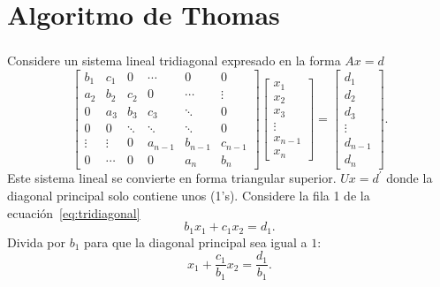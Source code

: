 \section{Algoritmo de Thomas}

\begin{frame}
	\frametitle{\insertsection}

	Considere un sistema lineal tridiagonal expresado en la forma $Ax=d$
	\begin{equation}\label{eq:tridiagonal}
		\begin{bmatrix}
			b_{1}  & c_{1}  & 0      & \cdots  & 0       & 0       \\
			a_{2}  & b_{2}  & c_{2}  & 0       & \cdots  & \vdots  \\
			0      & a_{3}  & b_{3}  & c_{3}   & \ddots  & 0       \\
			0      & 0      & \ddots & \ddots  & \ddots  & 0       \\
			\vdots & \vdots & 0      & a_{n-1} & b_{n-1} & c_{n-1} \\
			0      & \cdots & 0      & 0       & a_{n}   & b_{n}
		\end{bmatrix}
		\begin{bmatrix}
			x_{1}   \\
			x_{2}   \\
			x_{3}   \\
			\vdots  \\
			x_{n-1} \\
			x_{n}
		\end{bmatrix}=
		\begin{bmatrix}
			d_{1}   \\
			d_{2}   \\
			d_{3}   \\
			\vdots  \\
			d_{n-1} \\
			d_{n}
		\end{bmatrix}.
	\end{equation}
	Este sistema lineal se convierte en forma triangular superior.
	$Ux=d^{\prime}$ donde la diagonal principal solo contiene unos (1's).
	Considere la fila 1 de la ecuación~\eqref{eq:tridiagonal}
	\begin{equation*}
		b_{1}x_{1}+
		c_{1}x_{2}=
		d_{1}.
	\end{equation*}
	Divida por $b_{1}$ para que la diagonal principal sea igual a $1$:
	\begin{equation*}
		x_{1}+
		\frac{c_{1}}{b_{1}}x_{2}=
		\frac{d_{1}}{b_{1}}.
	\end{equation*}

\end{frame}

